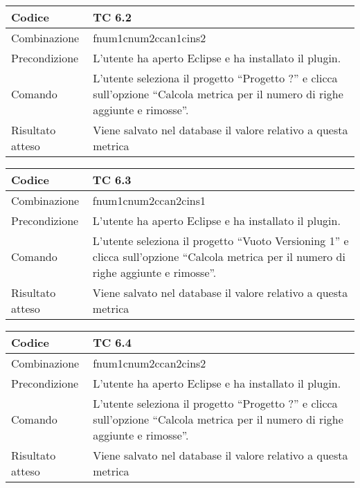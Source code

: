 \begin{table}[ht]
\begin{tabular}{|p{3cm}|p{9cm}|}
\hline
\cellcolor{lightgray}Codice				& TC 6.2								\\
\hline
\cellcolor{lightgray}Combinazione		& fnum1cnum2ccan1cins2 									\\
\hline
\cellcolor{lightgray}Precondizione		& L'utente ha aperto Eclipse e ha installato il plugin.				\\
\hline
\cellcolor{lightgray}Comando			& L'utente seleziona il progetto ``Progetto ?''  e clicca sull'opzione ``Calcola metrica per il numero di righe aggiunte e rimosse''.	\\
\hline
\cellcolor{lightgray}Risultato atteso	& Viene salvato nel database il valore relativo a questa metrica	\\
\hline
\end{tabular}
\end{table}

\begin{table}[ht]
\begin{tabular}{|p{3cm}|p{9cm}|}
\hline
\cellcolor{lightgray}Codice				& TC 6.3								\\
\hline
\cellcolor{lightgray}Combinazione		& fnum1cnum2ccan2cins1								\\
\hline
\cellcolor{lightgray}Precondizione		& L'utente ha aperto Eclipse e ha installato il plugin.					\\
\hline
\cellcolor{lightgray}Comando			& L'utente seleziona il progetto ``Vuoto Versioning 1''  e clicca sull'opzione ``Calcola metrica per il numero di righe aggiunte e rimosse''.	\\
\hline
\cellcolor{lightgray}Risultato atteso	& Viene salvato nel database il valore relativo a questa metrica	\\
\hline
\end{tabular}
\end{table}

\begin{table}[ht]
\begin{tabular}{|p{3cm}|p{9cm}|}
\hline
\cellcolor{lightgray}Codice				& TC 6.4								\\
\hline
\cellcolor{lightgray}Combinazione		& fnum1cnum2ccan2cins2							\\
\hline
\cellcolor{lightgray}Precondizione		& L'utente ha aperto Eclipse e ha installato il plugin.			\\
\hline
\cellcolor{lightgray}Comando			& L'utente seleziona il progetto ``Progetto ?''  e clicca sull'opzione ``Calcola metrica per il numero di righe aggiunte e rimosse''.	\\
\hline
\cellcolor{lightgray}Risultato atteso	& Viene salvato nel database il valore relativo a questa metrica	\\
\hline
\end{tabular}
\end{table}

